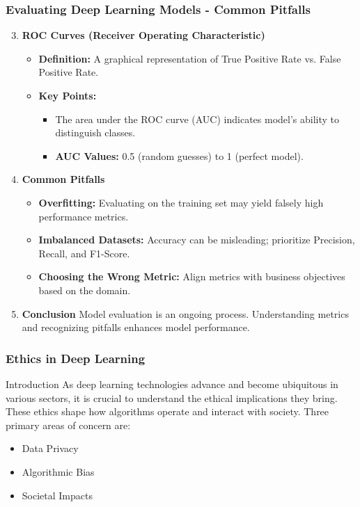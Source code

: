\documentclass[aspectratio=169]{beamer}
\begin{document}
\begin{frame}[fragile]
    \frametitle{Evaluating Deep Learning Models - Common Pitfalls}
    \begin{enumerate}
        \setcounter{enumi}{2}
        \item \textbf{ROC Curves (Receiver Operating Characteristic)}
        \begin{itemize}
            \item \textbf{Definition:} A graphical representation of True Positive Rate vs. False Positive Rate.
            \item \textbf{Key Points:}
            \begin{itemize}
                \item The area under the ROC curve (AUC) indicates model's ability to distinguish classes.
                \item \textbf{AUC Values:} 0.5 (random guesses) to 1 (perfect model).
            \end{itemize}
        \end{itemize}
        
        \item \textbf{Common Pitfalls}
        \begin{itemize}
            \item \textbf{Overfitting:} Evaluating on the training set may yield falsely high performance metrics.
            \item \textbf{Imbalanced Datasets:} Accuracy can be misleading; prioritize Precision, Recall, and F1-Score.
            \item \textbf{Choosing the Wrong Metric:} Align metrics with business objectives based on the domain.
        \end{itemize}
        
        \item \textbf{Conclusion}
        Model evaluation is an ongoing process. Understanding metrics and recognizing pitfalls enhances model performance.
    \end{enumerate}
\end{frame}

\begin{frame}[fragile]
    \frametitle{Ethics in Deep Learning}
    \begin{block}{Introduction}
        As deep learning technologies advance and become ubiquitous in various sectors, it is crucial to understand the ethical implications they bring. These ethics shape how algorithms operate and interact with society. Three primary areas of concern are:
    \end{block}
    \begin{itemize}
        \item Data Privacy
        \item Algorithmic Bias
        \item Societal Impacts
    \end{itemize}
\end{frame}
\end{document}
